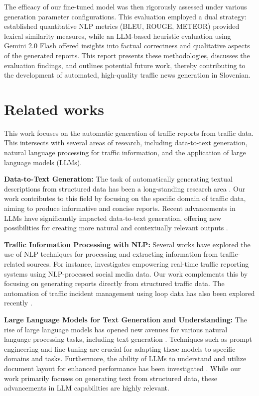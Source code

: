\documentclass[fleqn,moreauthors,10pt]{ds_report}
\begin{document}
The efficacy of our fine-tuned model was then rigorously assessed under various generation parameter configurations. This evaluation employed a dual strategy: established quantitative NLP metrics (BLEU, ROUGE, METEOR) provided lexical similarity measures, while an LLM-based heuristic evaluation using Gemini 2.0 Flash offered insights into factual correctness and qualitative aspects of the generated reports. This report presents these methodologies, discusses the evaluation findings, and outlines potential future work, thereby contributing to the development of automated, high-quality traffic news generation in Slovenian.

\section*{Related works}

This work focuses on the automatic generation of traffic reports from traffic data. This intersects with several areas of research, including data-to-text generation, natural language processing for traffic information, and the application of large language models (LLMs).

\textbf{Data-to-Text Generation:} The task of automatically generating textual descriptions from structured data has been a long-standing research area \cite{Data2Text}. Our work contributes to this field by focusing on the specific domain of traffic data, aiming to produce informative and concise reports. Recent advancements in LLMs have significantly impacted data-to-text generation, offering new possibilities for creating more natural and contextually relevant outputs \cite{LlamaIndex2025}.

\textbf{Traffic Information Processing with NLP:} Several works have explored the use of NLP techniques for processing and extracting information from traffic-related sources. For instance, \cite{articleRTTRS} investigates empowering real-time traffic reporting systems using NLP-processed social media data. Our work complements this by focusing on generating reports directly from structured traffic data. The automation of traffic incident management using loop data has also been explored recently \cite{cercola2025automatinglooptrafficincident}.

\textbf{Large Language Models for Text Generation and Understanding:} The rise of large language models has opened new avenues for various natural language processing tasks, including text generation \cite{vreš2024generativemodellessresourcedlanguage, zhu2024multilingualmachinetranslationlarge, pelofske2024automatedmultilanguageenglishmachine, peng2024automaticnewsgenerationfactchecking}. Techniques such as prompt engineering \cite{white2023promptpatterncatalogenhance} and fine-tuning \cite{j2024finetuningllmenterprise, j2024finetuningllmenterprise} are crucial for adapting these models to specific domains and tasks. Furthermore, the ability of LLMs to understand and utilize document layout for enhanced performance has been investigated \cite{10.1007/978-3-031-70546-5_9}. While our work primarily focuses on generating text from structured data, these advancements in LLM capabilities are highly relevant.
\end{document}
